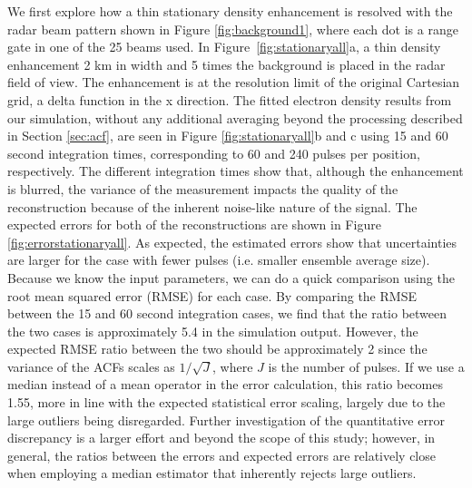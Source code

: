 \documentclass[draft,ras]{agutex}
\begin{document}
\begin{article}
We first explore how a thin stationary density enhancement is resolved with the radar beam pattern shown in Figure \ref{fig:background1}, where each dot is a range gate in one of the 25 beams used. In Figure~\ref{fig:stationaryall}a, a thin density enhancement 2 km in width and 5 times the background is placed in the radar field of view. The enhancement is at the resolution limit of the original Cartesian grid, a delta function in the x direction.  The fitted electron density results from our simulation, without any additional averaging beyond the processing described in Section \ref{sec:acf},
are seen in Figure \ref{fig:stationaryall}b and c using 15 and 60 second integration times, corresponding to 60 and 240 pulses per position, respectively. The different integration times show that, although the enhancement is blurred, the variance of the measurement impacts the quality of the reconstruction because of the inherent noise-like nature of the signal. The expected errors for both of the reconstructions are shown in Figure \ref{fig:errorstationaryall}. As expected, the estimated errors show that uncertainties are larger for the case with fewer pulses (i.e. smaller ensemble average size). 
Because we know the input parameters, we can do a quick comparison using the root mean squared error (RMSE) for each case. By comparing the RMSE between the 15 and 60 second integration cases, we find that the ratio between the two cases is approximately 5.4 in the simulation output.  However, the expected RMSE ratio between the two should be approximately 2 since the variance of the ACFs scales as $1/\sqrt{J}$, where $J$ is the number of pulses. If we use a median instead of a mean operator in the error calculation, this ratio becomes 1.55, more in line with the expected statistical error scaling, largely due to the large outliers being disregarded.  Further investigation of the quantitative error discrepancy is a larger effort and beyond the scope of this study; however, in general, the ratios between the errors and expected errors are relatively close when employing a median estimator that inherently rejects large outliers.

\end{article}
\end{document}

